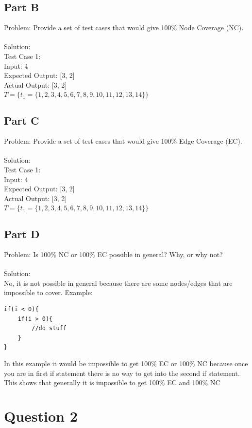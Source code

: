 \documentclass{article}
\begin{document}
\subsection*{Part B}
Problem: Provide a set of test cases that would give 100\% Node Coverage (NC). \\\\
Solution:\\
Test Case 1: \\
Input: 4 \\
Expected Output: [3, 2]\\
Actual Output: [3, 2]\\
$T = \{ t_1 = \{1, 2, 3, 4, 5, 6, 7, 8, 9, 10, 11, 12, 13, 14\}\}$
\subsection*{Part C}
Problem: Provide a set of test cases that would give 100\% Edge Coverage (EC). \\\\
Solution: \\
Test Case 1: \\
Input: 4 \\
Expected Output: [3, 2]\\
Actual Output: [3, 2]\\
$T = \{ t_1 = \{1, 2, 3, 4, 5, 6, 7, 8, 9, 10, 11, 12, 13, 14\}\}$
\subsection*{Part D}
Problem: Is 100\% NC or 100\% EC possible in general? Why, or why not? \\\\
Solution: \\
No, it is not possible in general because there are some nodes/edges that are impossible to cover.
Example: 
\begin{Verbatim}[tabsize=4]
if(i < 0){
	if(i > 0){
		//do stuff
	}
}	
\end{Verbatim}
In this example it would be impossible to get 100\% EC or 100\% NC because once you are in first if statement there is no way to get into the second if statement. This shows that generally it is impossible to get 100\% EC and 100\% NC
\newpage

\section*{Question 2}
\end{document}

